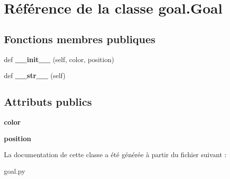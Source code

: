 \hypertarget{classgoal_1_1Goal}{}\section{Référence de la classe goal.\+Goal}
\label{classgoal_1_1Goal}
\subsection*{Fonctions membres publiques}
\begin{DoxyCompactItemize}
\item 
\mbox{\label{classgoal_1_1Goal_ab9a39523eac5144fe1102e23e94acd5b}} 
def {\bfseries \+\_\+\+\_\+init\+\_\+\+\_\+} (self, color, position)
\item 
\mbox{\label{classgoal_1_1Goal_af125fb03f7d4358fbf776a30da242df1}} 
def {\bfseries \+\_\+\+\_\+str\+\_\+\+\_\+} (self)
\end{DoxyCompactItemize}
\subsection*{Attributs publics}
\begin{DoxyCompactItemize}
\item 
\mbox{\label{classgoal_1_1Goal_a54d5132d78565d7996ec4c31c41a0192}} 
{\bfseries color}
\item 
\mbox{\label{classgoal_1_1Goal_a33e1f2b7e55c34c8288aef4f79697d23}} 
{\bfseries position}
\end{DoxyCompactItemize}


La documentation de cette classe a été générée à partir du fichier suivant \+:\begin{DoxyCompactItemize}
\item 
goal.\+py\end{DoxyCompactItemize}
